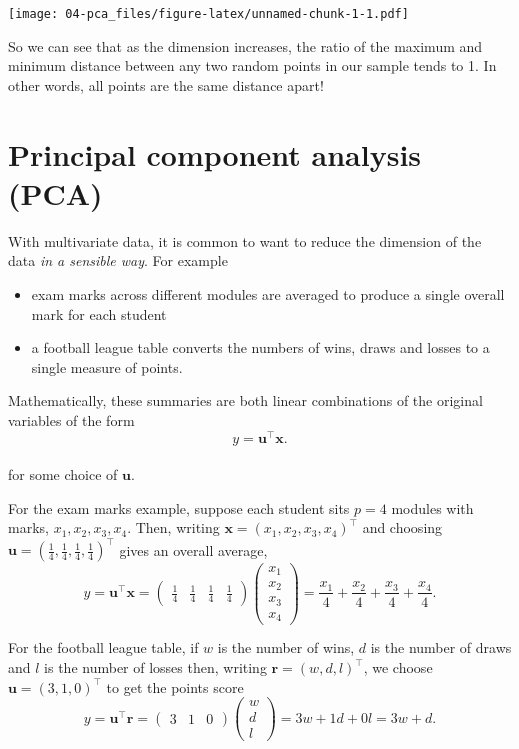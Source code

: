 \documentclass[]{book}
\theoremstyle{definition}
\theoremstyle{definition}
\theoremstyle{definition}
\theoremstyle{remark}
\begin{document}
\texttt{[image: 04-pca\_files/figure-latex/unnamed-chunk-1-1.pdf]}

So we can see that as the dimension increases, the ratio of the maximum and minimum distance between any two random points in our sample tends to 1. In other words, all points are the same distance apart!

\hypertarget{pca}{%
\chapter{Principal component analysis (PCA)}\label{pca}}

With multivariate data, it is common to want to reduce the dimension of the data \emph{in a sensible way}. For example

\begin{itemize}
\item
  exam marks across different modules are
  averaged to produce a single overall mark for each
  student
\item
  a football league table converts the
  numbers of wins, draws and losses to a single measure of
  points.
\end{itemize}

Mathematically, these summaries
are both linear combinations of the
original variables of the form
\[y = \boldsymbol u^\top \boldsymbol x.\]\\
for some choice of \(\boldsymbol u\).

For the exam marks example, suppose each student sits \(p=4\) modules
with marks, \(x_1,x_2,x_3,x_4\). Then, writing \(\boldsymbol x=(x_1, x_2 , x_3, x_4)^\top\) and choosing \(\boldsymbol u= \left(\frac{1}{4}, \frac{1}{4}, \frac{1}{4}, \frac{1}{4} \right)^\top\)
gives an overall average,
\[ y =\boldsymbol u^\top \boldsymbol x= \begin{pmatrix} \frac{1}{4} & \frac{1}{4} & \frac{1}{4} & \frac{1}{4} \end{pmatrix} \begin{pmatrix} x_1 \\ x_2 \\ x_3 \\ x_4 \end{pmatrix} = \frac{x_1}{4} + \frac{x_2}{4} + \frac{x_3}{4} + \frac{x_4}{4}.\]

For the football league table, if \(w\) is the number of wins, \(d\) is the number of draws and \(l\) is the number of losses then, writing
\({\mathbf r}=(w,d,l)^\top\), we choose \(\boldsymbol u= \left(3,1,0 \right)^\top\) to get the points score
\[ y = \boldsymbol u^\top {\mathbf r}=\begin{pmatrix} 3 & 1 & 0 \end{pmatrix} \begin{pmatrix} w \\ d \\ l \end{pmatrix} = 3w + 1d + 0l=3w+d.\]
\end{document}
